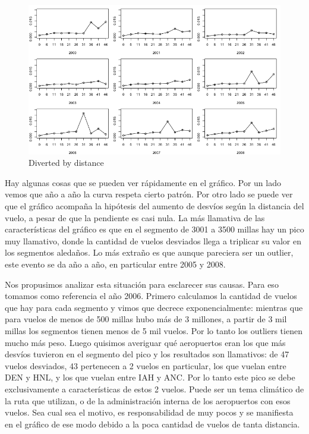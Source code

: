 \begin{figure}[h!]
  \begin{center}
	\includegraphics[scale=0.5]{img/diverted_by_distance.png}
	\caption{Diverted by distance}
  \end{center}
\end{figure}

Hay algunas cosas que se pueden ver rápidamente en el gráfico. 
Por un lado vemos que año a año la curva respeta cierto patrón. 
Por otro lado se puede ver que el gráfico acompaña la hipótesis del aumento de desvíos según la distancia del vuelo, a pesar de que la pendiente es casi nula.
La más llamativa de las características del gráfico es que en el segmento de 3001 a 3500 millas hay un pico muy llamativo, donde la cantidad de vuelos desviados llega a triplicar su valor en los segmentos aledaños. Lo más extraño es que aunque pareciera ser un outlier, este evento se da año a año, en particular entre 2005 y 2008.

Nos propusimos analizar esta situación para esclarecer sus causas. Para eso tomamos como referencia el año 2006. Primero calculamos la cantidad de vuelos que hay para cada segmento y vimos que decrece exponencialmente: mientras que para vuelos de menos de 500 millas hubo más de 3 millones, a partir de 3 mil millas los segmentos tienen menos de 5 mil vuelos. Por lo tanto los outliers tienen mucho más peso. Luego quisimos averiguar qué aeropuertos eran los que más desvíos tuvieron en el segmento del pico y los resultados son llamativos: de 47 vuelos desviados, 43 pertenecen a 2 vuelos en particular, los que vuelan entre DEN y HNL, y los que vuelan entre IAH y ANC.
Por lo tanto este pico se debe exclusivamente a características de estos 2 vuelos. Puede ser un tema climático de la ruta que utilizan, o de la administración interna de los aeropuertos con esos vuelos. Sea cual sea el motivo, es responsabilidad de muy pocos y se manifiesta en el gráfico de ese modo debido a la poca cantidad de vuelos de tanta distancia.



